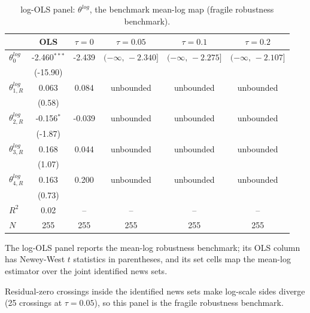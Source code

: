 \documentclass[11pt]{article}
\begin{document}
\begin{table}[!htbp]
\centering
\begin{threeparttable}
\caption{log-OLS panel: $\theta^{log}$, the benchmark mean-log map (fragile robustness benchmark).}
\label{tab:log_var_eq_panel_logols}
\footnotesize\setlength{\tabcolsep}{3pt}
\begin{tabular}{lccccc}
\toprule
 & OLS & $\tau{=}0$ & $\tau{=}0.05$ & $\tau{=}0.1$ & $\tau{=}0.2$ \\
\midrule
$\theta^{log}_0$ & -2.460$^{***}$ & -2.439 & $(-\infty,\,-2.340]$ & $(-\infty,\,-2.275]$ & $(-\infty,\,-2.107]$ \\
 & (-15.90) &  &  &  &  \\
\midrule
$\theta^{log}_{1,R}$ & 0.063 & 0.084 & unbounded & unbounded & unbounded \\
 & (0.58) &  &  &  &  \\
$\theta^{log}_{2,R}$ & -0.156$^{*}$ & -0.039 & unbounded & unbounded & unbounded \\
 & (-1.87) &  &  &  &  \\
$\theta^{log}_{3,R}$ & 0.168 & 0.044 & unbounded & unbounded & unbounded \\
 & (1.07) &  &  &  &  \\
$\theta^{log}_{4,R}$ & 0.163 & 0.200 & unbounded & unbounded & unbounded \\
 & (0.73) &  &  &  &  \\
$R^2$ & 0.02 & -- & -- & -- & -- \\
$N$ & 255 & 255 & 255 & 255 & 255 \\
\bottomrule
\end{tabular}
\begin{tablenotes}[flushleft]
\scriptsize
\item The log-OLS panel reports the mean-log robustness benchmark; its OLS column has Newey-West $t$ statistics in parentheses, and its set cells map the mean-log estimator over the joint identified news sets.
\item Residual-zero crossings inside the identified news sets make log-scale sides diverge (25 crossings at $\tau{=}0.05$), so this panel is the fragile robustness benchmark.
\end{tablenotes}
\end{threeparttable}
\end{table}
\end{document}
